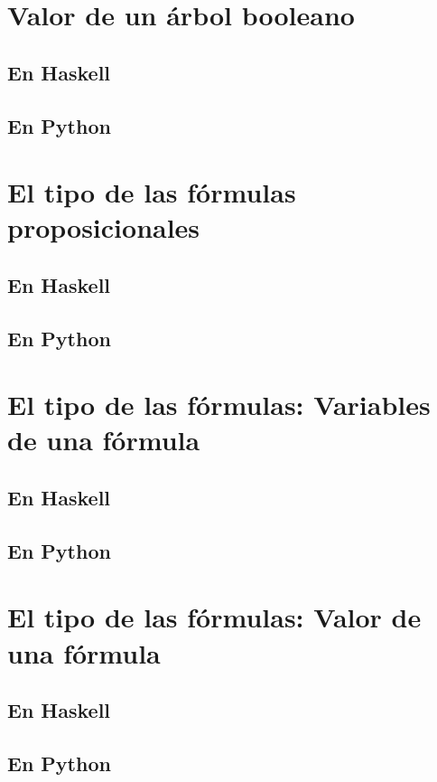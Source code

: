 \documentclass[a4paper,12pt,twoside]{book}
\begin{document}
\section{Valor de un árbol booleano}
\subsection{En Haskell}
\subsection{En Python}

\section{El tipo de las fórmulas proposicionales}
\subsection{En Haskell}
\subsection{En Python}

\section{El tipo de las fórmulas: Variables de una fórmula}
\subsection*{En Haskell}
\subsection*{En Python}

\section{El tipo de las fórmulas: Valor de una fórmula}
\subsection*{En Haskell}
\subsection*{En Python}
\end{document}
